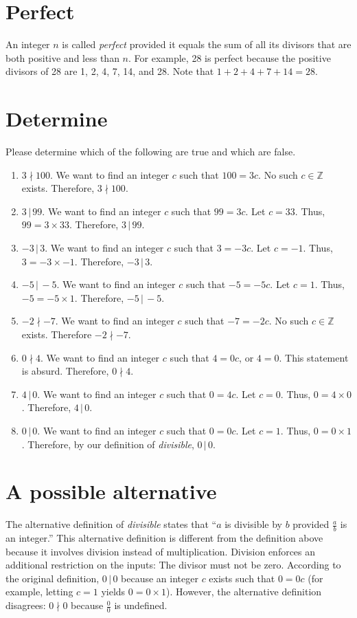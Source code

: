 \documentclass[12pt]{article}
\begin{document}
\section*{Perfect}
An integer $n$ is called \textit{perfect} provided it equals the sum of all its divisors that are both positive and less than $n$. For example, 28 is perfect because the positive divisors of 28 are 1, 2, 4, 7, 14, and 28. Note that $1+2+4+7+14=28$.
\section{Determine}
Please determine which of the following are true and which are false.
\begin{enumerate}
    \item$3\nmid 100$. We want to find an integer $c$ such that $100=3c$. No such $c\in\mathbb{Z}$ exists. Therefore, $3\nmid 100$.
    \item$3\,|\,99$. We want to find an integer $c$ such that $99=3c$. Let $c=33$. Thus, $99=3\times 33$. Therefore, $3\,|\,99$.
    \item$-3\,|\,3$. We want to find an integer $c$ such that $3=-3c$. Let $c=-1$. Thus, $3=-3\times-1$. Therefore, $-3\,|\,3.$
    \item$-5\,|\,-5$. We want to find an integer $c$ such that $-5=-5c$. Let $c=1$. Thus, $-5=-5\times 1$. Therefore, $-5\,|\,-5.$
    \item$-2\nmid-7$. We want to find an integer $c$ such that $-7=-2c$. No such $c\in\mathbb{Z}$ exists. Therefore $-2\nmid -7$.
    \item$0\nmid 4$. We want to find an integer $c$ such that $4=0c$, or $4=0$. This statement is absurd. Therefore, $0\nmid 4$.
    \item$4\,|\,0$. We want to find an integer $c$ such that $0=4c$. Let $c=0$. Thus, $0=4\times 0$. Therefore, $4\,|\,0$.
    \item$0\,|\,0$. We want to find an integer $c$ such that $0=0c$. Let $c=1$. Thus, $0=0\times 1$. Therefore, by our definition of \textit{divisible}, $0\,|\,0$.
\end{enumerate}
\section{A possible alternative}
The alternative definition of \textit{divisible} states that ``$a$ is divisible by $b$ provided $\frac{a}{b}$ is an integer.'' This alternative definition is different from the definition above because it involves division instead of multiplication. Division enforces an additional restriction on the inputs: The divisor must not be zero. According to the original definition, $0\,|\,0$ because an integer $c$ exists such that $0=0c$ (for example, letting $c=1$ yields $0=0\times 1$). However, the alternative definition disagrees: $0\nmid 0$ because $\frac{0}{0}$ is undefined.
\end{document}
